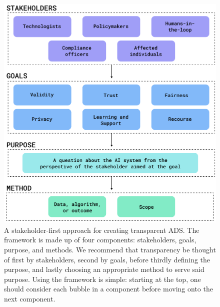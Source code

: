 \begin{figure}[t!]
    \begin{center}
    \includegraphics[width=1.0\linewidth]{figs/figure1.png}
    \end{center}
    \caption{A stakeholder-first approach for creating transparent ADS. The framework is made up of four components: stakeholders, goals, purpose, and methods. We recommend that transparency be thought of first by stakeholders, second by goals, before thirdly defining the purpose, and lastly choosing an appropriate method to serve said purpose. Using the framework is simple: starting at the top, one should consider each bubble in a component before moving onto the next component.}
    \label{fig:taxonomy}
\end{figure}

